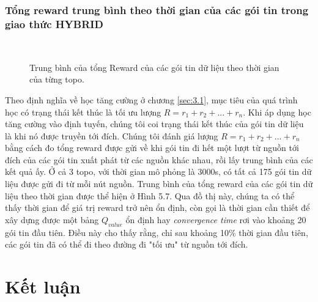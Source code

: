 \documentclass[12pt]{report}
\begin{document}
\subsection{Tổng reward trung bình theo thời gian của các gói tin trong giao thức HYBRID}
\begin{figure}[h]
\centering
{}
\\
\caption{Trung bình của tổng Reward của các gói tin dữ liệu theo thời gian của từng topo.}
\label{fig:globfig}
\end{figure}
Theo định nghĩa về học tăng cường ở chương \ref{sec:3.1}, mục tiêu của quá trình học có trạng thái kết thúc là tối ưu lượng $R = r_{1} + r_{2} + ... + r_{n}$. Khi áp dụng học tăng cường vào định tuyến, chúng tôi coi trạng thái kết thúc của gói tin dữ liệu là khi nó được truyền tới đích. Chúng tôi đánh giá lượng $R = r_{1} + r_{2} + ... + r_{n}$ bằng cách đo tổng reward được gửi về khi gói tin đi hết một lượt từ nguồn tới đích của các gói tin xuất phát từ các nguồn khác nhau, rồi lấy trung bình của các kết quả ấy. Ở cả 3 topo, với thời gian mô phỏng là 3000s, có tất cả 175 gói tin dữ liệu được gửi đi từ mỗi nút nguồn. Trung bình của tổng reward của các gói tin dữ liệu theo thời gian được thể hiện ở Hình 5.7. Qua đồ thị này, chúng ta có thể thấy thời gian để giá trị reward trở nên ổn định, còn gọi là thời gian cần thiết để xây dựng được một bảng $Q_{value}$ ổn định hay \textit{convergence time} rơi vào khoảng 20 gói tin đầu tiên. Điều này cho thấy rằng, chỉ sau khoảng 10\% thời gian đầu tiên, các gói tin đã có thể đi theo đường đi "tối ưu" từ nguồn tới đích. 
\chapter{Kết luận}
\label{sec:6}
\end{document}
